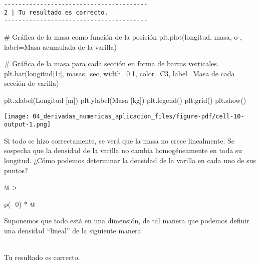 \documentclass[
  letterpaper,
  DIV=11,
  numbers=noendperiod]{scrreprt}
\newenvironment{Shaded}{\begin{snugshade}}{\end{snugshade}}
\newcommand{\CommentTok}[1]{\textcolor[rgb]{0.37,0.37,0.37}{#1}}
\newcommand{\DecValTok}[1]{\textcolor[rgb]{0.68,0.00,0.00}{#1}}
\newcommand{\FloatTok}[1]{\textcolor[rgb]{0.68,0.00,0.00}{#1}}
\newcommand{\NormalTok}[1]{\textcolor[rgb]{0.00,0.23,0.31}{#1}}
\newcommand{\OperatorTok}[1]{\textcolor[rgb]{0.37,0.37,0.37}{#1}}
\newcommand{\StringTok}[1]{\textcolor[rgb]{0.13,0.47,0.30}{#1}}
\begin{document}
\begin{verbatim}
----------------------------------------
2 | Tu resultado es correcto.
----------------------------------------
\end{verbatim}

\begin{Shaded}
\begin{Highlighting}[]
\CommentTok{\# Gráfica de la masa como función de la posición}
\NormalTok{plt.plot(longitud, masa, }
         \StringTok{\textquotesingle{}o{-}\textquotesingle{}}\NormalTok{, label}\OperatorTok{=}\StringTok{\textquotesingle{}Masa acumulada de la varilla\textquotesingle{}}\NormalTok{)}

\CommentTok{\# Gráfica de la masa para cada sección en forma de barras verticales.}
\NormalTok{plt.bar(longitud[}\DecValTok{1}\NormalTok{:], masas\_sec, }
\NormalTok{        width}\OperatorTok{=}\FloatTok{0.1}\NormalTok{, color}\OperatorTok{=}\StringTok{\textquotesingle{}C3\textquotesingle{}}\NormalTok{, }
\NormalTok{        label}\OperatorTok{=}\StringTok{\textquotesingle{}Masa de cada sección de varilla\textquotesingle{}}\NormalTok{)}

\NormalTok{plt.xlabel(}\StringTok{\textquotesingle{}Longitud [m]\textquotesingle{}}\NormalTok{)}
\NormalTok{plt.ylabel(}\StringTok{\textquotesingle{}Masa [kg]\textquotesingle{}}\NormalTok{)}
\NormalTok{plt.legend()}
\NormalTok{plt.grid()}
\NormalTok{plt.show()}
\end{Highlighting}
\end{Shaded}

\texttt{[image: 04\_derivadas\_numericas\_aplicacion\_files/figure-pdf/cell-10-output-1.png]}

Si todo se hizo correctamente, se verá que la masa no crece linealmente.
Se sospecha que la densidad de la varilla no cambia homogéneamente en
toda su longitud. ¿Cómo podemos determinar la densidad de la varilla en
cada uno de sus puntos?

\begin{longtable}[]{@{}
  >{\raggedright\arraybackslash}p{(\columnwidth - 0\tabcolsep) * }@{}}
\toprule\noalign{}
\begin{minipage}[b]{\linewidth}\raggedright
Suponemos que todo está en una dimensión, de tal manera que podemos
definir una densidad ``lineal'' de la siguiente manera:
\end{minipage} \\
\midrule\noalign{}
\endhead
\bottomrule\noalign{}
 \textbar{} Tu resultado es correcto. \\
\end{longtable}
\end{document}
